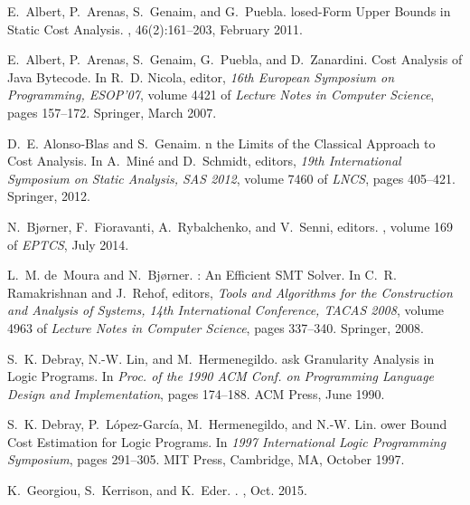 \documentclass{llncs}
\begin{document}
\begin{thebibliography}{10}

E.~Albert, P.~Arenas, S.~Genaim, and G.~Puebla.
losed-{F}orm {U}pper {B}ounds in {S}tatic {C}ost {A}nalysis.
, 46(2):161--203, February 2011.

E.~Albert, P.~Arenas, S.~Genaim, G.~Puebla, and D.~Zanardini.
\newblock Cost {A}nalysis of {J}ava {B}ytecode.
\newblock In R.~D. Nicola, editor, {\em 16th European Symposium on Programming,
  ESOP'07}, volume 4421 of {\em Lecture Notes in Computer Science}, pages
  157--172. Springer, March 2007.

D.~E. Alonso{-}Blas and S.~Genaim.
n the {L}imits of the {C}lassical {A}pproach to {C}ost {A}nalysis.
\newblock In A.~Min{\'{e}} and D.~Schmidt, editors, {\em 19th International
  Symposium on Static Analysis, {SAS} 2012}, volume 7460 of {\em LNCS}, pages
  405--421. Springer, 2012.

N.~Bj{\o}rner, F.~Fioravanti, A.~Rybalchenko, and V.~Senni, editors.
, volume 169 of {\em {EPTCS}}, July 2014.

L.~M. de~Moura and N.~Bj{\o}rner.
: {A}n {E}fficient {SMT} {S}olver.
\newblock In C.~R. Ramakrishnan and J.~Rehof, editors, {\em Tools and
  Algorithms for the Construction and Analysis of Systems, 14th International
  Conference, TACAS 2008}, volume 4963 of {\em Lecture Notes in Computer
  Science}, pages 337--340. Springer, 2008.

S.~K. Debray, N.-W. Lin, and M.~Hermenegildo.
ask {G}ranularity {A}nalysis in {L}ogic {P}rograms.
\newblock In {\em Proc. of the 1990 {ACM} Conf. on Programming Language Design
  and Implementation}, pages 174--188. {ACM} Press, June 1990.

S.~K. Debray, P.~L\'{o}pez-Garc\'{i}a, M.~Hermenegildo, and N.-W. Lin.
ower {B}ound {C}ost {E}stimation for {L}ogic {P}rograms.
\newblock In {\em 1997 International Logic Programming Symposium}, pages
  291--305. MIT Press, Cambridge, MA, October 1997.

K.~{Georgiou}, S.~{Kerrison}, and K.~{Eder}.
.
, Oct. 2015.


\end{thebibliography}
\end{document}
